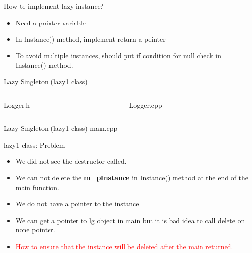 \documentclass[13pt]{beamer}
\begin{document}
\begin{frame}{How to implement lazy instance?}
\begin{itemize}
\setlength\itemsep{2em}

\item Need a pointer variable

\item In Instance() method, implement return a pointer

\item To avoid multiple instances, should put if condition for null check in Instance() method.

\end{itemize}
\end{frame}

\begin{frame}{Lazy Singleton (lazy1 class)}
\begin{columns}[T]
\begin{column}{.48\textwidth}
Logger.h
\lstset{basicstyle=\tiny,style=myCustomCppStyle}

\end{column}

\begin{column}{.48\textwidth}
Logger.cpp
\lstset{basicstyle=\tiny,style=myCustomCppStyle}

\end{column}
\end{columns}
\end{frame}

\begin{frame}{Lazy Singleton (lazy1 class)}
main.cpp
\lstset{basicstyle=\tiny,style=myCustomCppStyle}

\end{frame}

\begin{frame}{lazy1 class: Problem}
\begin{itemize}
\setlength\itemsep{1em}

\item We did not see the destructor called.

\item We can not delete the \textbf{m\_pInstance} in Instance() method at the end of the main function.

\item We do not have a pointer to the instance

\item We can get a pointer to lg object in main but it is bad idea to call delete on none pointer.

\item \textcolor{red}{How to ensure that the instance will be deleted after the main returned.}
\end{itemize}
\end{frame}
\end{document}
